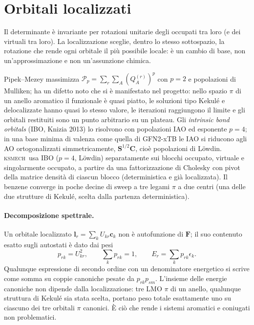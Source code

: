 \documentclass[11pt,a4paper]{report}
\newcommand{\vb}[1]{\bm{#1}}
\newcommand{\ksm}{\textsc{ksmech}}
\begin{document}
\section{Orbitali localizzati}
Il determinante è invariante per rotazioni unitarie degli occupati tra loro (e dei virtuali tra
loro). La localizzazione sceglie, dentro lo stesso sottospazio, la rotazione che rende ogni orbitale
il più possibile locale: è un cambio di base, non un'approssimazione e non un'assunzione chimica.

Pipek--Mezey massimizza $\mathcal{P}_p=\sum_r\sum_A (Q^{(r)}_A)^p$ con $p=2$ e popolazioni di
Mulliken; ha un difetto noto che si è manifestato nel progetto: nello spazio $\pi$ di un anello
aromatico il funzionale è quasi piatto, le soluzioni tipo Kekulé e delocalizzate hanno quasi lo
stesso valore, le iterazioni raggiungono il limite e gli orbitali restituiti sono un punto
arbitrario su un plateau. Gli \emph{intrinsic bond orbitals} (IBO, Knizia 2013) lo risolvono con
popolazioni IAO ed esponente $p=4$; in una base minima di valenza come quella di GFN2-xTB le IAO si
riducono agli AO ortogonalizzati simmetricamente, $\vb{S}^{1/2}\vb{C}$, cioè popolazioni di
Löwdin. \ksm\ usa IBO ($p=4$, Löwdin) separatamente sui blocchi occupato, virtuale e singolarmente
occupato, a partire da una fattorizzazione di Cholesky con pivot della matrice densità di ciascun
blocco (deterministica e già localizzata). Il benzene converge in poche decine di sweep a tre legami
$\pi$ a due centri (una delle due strutture di Kekulé, scelta dalla partenza deterministica).

\paragraph{Decomposizione spettrale.} Un orbitale localizzato $\vb{l}_r=\sum_kU_{kr}\vb{c}_k$ non è
autofunzione di $\vb{F}$; il suo contenuto esatto sugli autostati è dato dai pesi
\begin{equation}
p_{rk}=U_{kr}^2,\qquad\sum_kp_{rk}=1,\qquad E_r=\sum_kp_{rk}\epsilon_k .
\end{equation}
Qualunque espressione di secondo ordine con un denominatore energetico si scrive come somma su coppie
canoniche pesate da $p_{rk}p_{sm}$. L'insieme delle energie canoniche non dipende dalla
localizzazione: tre LMO $\pi$ di un anello, qualunque struttura di Kekulé sia stata scelta, portano
peso totale esattamente uno su ciascuno dei tre orbitali $\pi$ canonici. È ciò che rende i sistemi
aromatici e coniugati non problematici.
\end{document}
